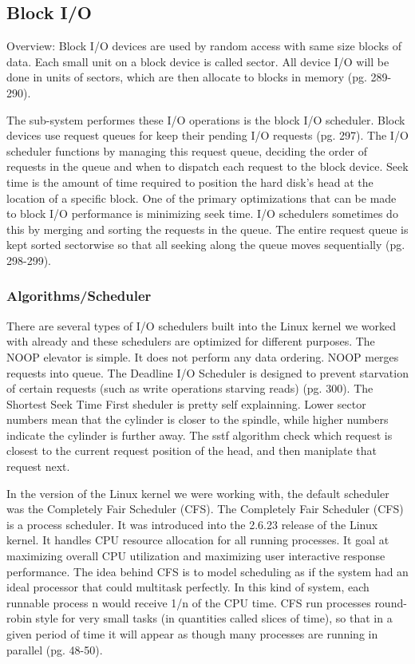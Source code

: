 \documentclass[10pt,draftclsnofoot,onecolumn,journal,compsoc]{IEEEtran}
\newcommand{\tab}{\hspace*{2em}} %
\begin{document}
\subsection{Block I/O}
\tab Overview: Block I/O devices are used by random access with same size blocks of data. Each small unit on a block device is called sector. All device I/O will be done in units of sectors, which are then allocate to blocks in memory \cite{Love}(pg. 289-290).

\tab The sub-system performes these I/O operations is the block I/O scheduler. Block devices use request queues for keep their pending I/O requests \cite{Love}(pg. 297). The I/O scheduler functions by managing this request queue, deciding the order of requests in the queue and when to dispatch each request to the block device. Seek time is the amount of time required to position the hard disk's head at the location of a specific block. One of the primary optimizations that can be made to block I/O performance is minimizing seek time. I/O schedulers sometimes do this by merging and sorting the requests in the queue. The entire request queue is kept sorted sectorwise so that all seeking along the queue moves sequentially \cite{Love}(pg. 298-299). 

\subsubsection*{Algorithms/Scheduler}
\tab There are several types of I/O schedulers built into the Linux kernel we worked with already and these schedulers are optimized for different purposes. The NOOP elevator is simple. It does not perform any data ordering. NOOP merges requests into queue. The Deadline I/O Scheduler is designed to prevent starvation of certain requests (such as write operations starving reads) \cite{Love}(pg. 300). The Shortest Seek Time First sheduler is pretty self explainning. Lower sector numbers mean that the cylinder is closer to the spindle, while higher numbers indicate the cylinder is further away. The sstf algorithm check which request is closest to the current request position of the head, and then maniplate that request next\cite{DSA}.

\tab In the version of the Linux kernel we were working with, the default scheduler was the Completely Fair Scheduler (CFS). The Completely Fair Scheduler (CFS) is a process scheduler. It was introduced into the 2.6.23 release of the Linux kernel. It handles CPU resource allocation for all running processes. It goal at maximizing overall CPU utilization and maximizing user interactive response performance. The idea behind CFS is to model scheduling as if the system had an ideal processor that could multitask perfectly. In this kind of system, each runnable process n would receive 1/n of the CPU time. CFS run processes round-robin style for very small tasks (in quantities called slices of time), so that in a given period of time it will appear as though many processes are running in parallel \cite{Love}(pg. 48-50).
\end{document}
